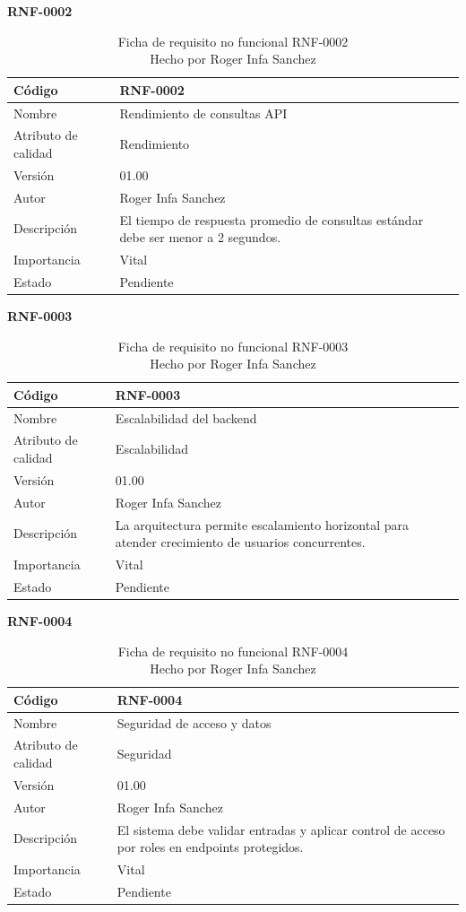 \textbf{RNF-0002}
\begin{longtable}{|p{}|p{}|}
\caption{Ficha de requisito no funcional RNF-0002\\Hecho por Roger Infa Sanchez} \\
\hline
Código & RNF-0002 \\
\hline
Nombre & Rendimiento de consultas API \\
\hline
Atributo de calidad & Rendimiento \\
\hline
Versión & 01.00 \\
\hline
Autor & Roger Infa Sanchez \\
\hline
Descripción & El tiempo de respuesta promedio de consultas estándar debe ser menor a 2 segundos. \\
\hline
Importancia & Vital \\
\hline
Estado & Pendiente \\
\hline
\end{longtable}

\textbf{RNF-0003}
\begin{longtable}{|p{}|p{}|}
\caption{Ficha de requisito no funcional RNF-0003\\Hecho por Roger Infa Sanchez} \\
\hline
Código & RNF-0003 \\
\hline
Nombre & Escalabilidad del backend \\
\hline
Atributo de calidad & Escalabilidad \\
\hline
Versión & 01.00 \\
\hline
Autor & Roger Infa Sanchez \\
\hline
Descripción & La arquitectura permite escalamiento horizontal para atender crecimiento de usuarios concurrentes. \\
\hline
Importancia & Vital \\
\hline
Estado & Pendiente \\
\hline
\end{longtable}

\textbf{RNF-0004}
\begin{longtable}{|p{}|p{}|}
\caption{Ficha de requisito no funcional RNF-0004\\Hecho por Roger Infa Sanchez} \\
\hline
Código & RNF-0004 \\
\hline
Nombre & Seguridad de acceso y datos \\
\hline
Atributo de calidad & Seguridad \\
\hline
Versión & 01.00 \\
\hline
Autor & Roger Infa Sanchez \\
\hline
Descripción & El sistema debe validar entradas y aplicar control de acceso por roles en endpoints protegidos. \\
\hline
Importancia & Vital \\
\hline
Estado & Pendiente \\
\hline
\end{longtable}

